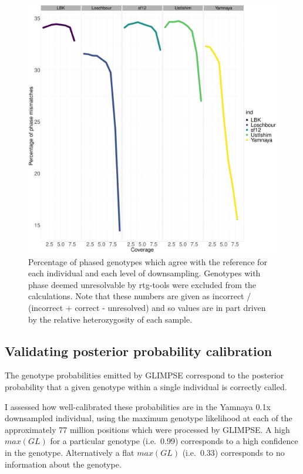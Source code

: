 \begin{figure}[htp]
    \centering
    \includegraphics[width=1.0\textwidth]{../images/chapter1/phasing_performance_downsampled.pdf}
    \caption{Percentage of phased genotypes which agree with the reference for each individual and each level of downsampling. Genotypes with phase deemed unresolvable by rtg-tools were excluded from the calculations. Note that these numbers are given as incorrect / (incorrect + correct - unresolved) and so values are in part driven by the relative heterozygosity of each sample.}
    \label{fig:phasing_performance_downsampled}
\end{figure}

\subsection{Validating posterior probability calibration}

The genotype probabilities emitted by GLIMPSE correspond to the posterior probability that a given genotype within a single individual is correctly called. 

I assessed how well-calibrated these probabilities are in the Yamnaya 0.1x downsampled individual, using the maximum genotype likelihood at each of the approximately 77 million positions which were processed by GLIMPSE. A high $max(GL)$ for a particular genotype (i.e.\ 0.99) corresponds to a high confidence in the genotype. Alternatively a flat $max(GL)$ (i.e.\ 0.33) corresponds to no information about the genotype. 

